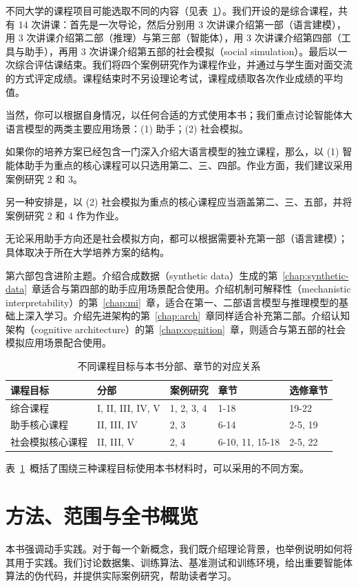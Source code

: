 不同大学的课程项目可能选取不同的内容（见表~\ref{tab:flow}）。我们开设的是综合课程，共有 14 次讲课：首先是一次导论，然后分别用 3 次讲课介绍第一部（语言建模），用 3 次讲课介绍第二部（推理）与第三部（智能体），用 3 次讲课介绍第四部（工具与助手），再用 3 次讲课介绍第五部的社会模拟（social simulation）。最后以一次综合评估课结束。我们将四个案例研究作为课程作业，并通过与学生面对面交流的方式评定成绩。课程结束时不另设理论考试，课程成绩取各次作业成绩的平均值。

当然，你可以根据自身情况，以任何合适的方式使用本书；我们重点讨论智能体大语言模型的两类主要应用场景：(1) 助手；(2) 社会模拟。

如果你的培养方案已经包含一门深入介绍大语言模型的独立课程，那么，以 (1) 智能体助手为重点的核心课程可以只选用第二、三、四部。作业方面，我们建议采用案例研究 2 和 3。

另一种安排是，以 (2) 社会模拟为重点的核心课程应当涵盖第二、三、五部，并将案例研究 2 和 4 作为作业。

无论采用助手方向还是社会模拟方向，都可以根据需要补充第一部（语言建模）；具体取决于所在大学培养方案的结构。

第六部包含进阶主题。介绍合成数据（synthetic data）生成的第~\ref{chap:synthetic-data}~章适合与第四部的助手应用场景配合使用。介绍机制可解释性（mechanistic interpretability）的第~\ref{chap:mi}~章，适合在第一、二部语言模型与推理模型的基础上深入学习。介绍先进架构的第~\ref{chap:arch}~章同样适合补充第二部。介绍认知架构（cognitive architecture）的第~\ref{chap:cognition}~章，则适合与第五部的社会模拟应用场景配合使用。

\begin{table}
    \centering
    \begin{tabular}{l|l|l|l|l}
        课程目标 & 分部 & 案例研究 & 章节 & 选修章节 \\ \hline
        综合课程 & I, II, III, IV, V & 1, 2, 3, 4 & 1-18 & 19-22\\
        助手核心课程 & II, III, IV & 2, 3 & 6-14 & 2-5, 19\\
        社会模拟核心课程 & II, III, V & 2, 4 & 6-10, 11, 15-18 & 2-5, 22\\
    \end{tabular}
    \caption{不同课程目标与本书分部、章节的对应关系}
    \label{tab:flow}
\end{table}

表~\ref{tab:flow}~概括了围绕三种课程目标使用本书材料时，可以采用的不同方案。

\section{方法、范围与全书概览}
本书强调动手实践。对于每一个新概念，我们既介绍理论背景，也举例说明如何将其用于实践。我们讨论数据集、训练算法、基准测试和训练环境，给出重要智能体算法的伪代码，并提供实际案例研究，帮助读者学习。


